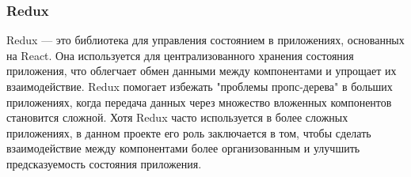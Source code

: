 \subsubsection{Redux}
Redux --- это библиотека для управления состоянием в приложениях, основанных на React. Она используется для централизованного хранения состояния приложения, что облегчает обмен данными между компонентами и упрощает их взаимодействие. Redux помогает избежать "проблемы пропс-дерева" в больших приложениях, когда передача данных через множество вложенных компонентов становится сложной. Хотя Redux часто используется в более сложных приложениях, в данном проекте его роль заключается в том, чтобы сделать взаимодействие между компонентами более организованным и улучшить предсказуемость состояния приложения.


